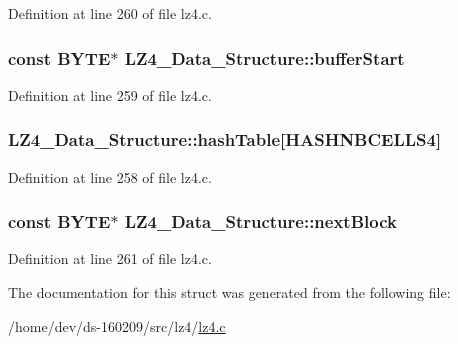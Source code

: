 Definition at line 260 of file lz4.\+c.

\hypertarget{struct_l_z4___data___structure_a3cfd405b97b4998b89dd9fad44e14714}{}
\subsubsection[{buffer\+Start}]{\setlength{\rightskip}{0pt plus 5cm}const {\bf B\+Y\+T\+E}$\ast$ L\+Z4\+\_\+\+Data\+\_\+\+Structure\+::buffer\+Start}\label{struct_l_z4___data___structure_a3cfd405b97b4998b89dd9fad44e14714}


Definition at line 259 of file lz4.\+c.

\hypertarget{struct_l_z4___data___structure_a619a192c8d9e8dc479fd8df09106e0bf}{}
\subsubsection[{hash\+Table}]{ L\+Z4\+\_\+\+Data\+\_\+\+Structure\+::hash\+Table\mbox{[}{\bf H\+A\+S\+H\+N\+B\+C\+E\+L\+L\+S4}\mbox{]}}\label{struct_l_z4___data___structure_a619a192c8d9e8dc479fd8df09106e0bf}


Definition at line 258 of file lz4.\+c.

\hypertarget{struct_l_z4___data___structure_a7e7e3cfaeae61371275c713ddff64b15}{}
\subsubsection[{next\+Block}]{\setlength{\rightskip}{0pt plus 5cm}const {\bf B\+Y\+T\+E}$\ast$ L\+Z4\+\_\+\+Data\+\_\+\+Structure\+::next\+Block}\label{struct_l_z4___data___structure_a7e7e3cfaeae61371275c713ddff64b15}


Definition at line 261 of file lz4.\+c.



The documentation for this struct was generated from the following file\+:\begin{DoxyCompactItemize}
\item 
/home/dev/ds-\/160209/src/lz4/\hyperlink{lz4_8c}{lz4.\+c}\end{DoxyCompactItemize}
